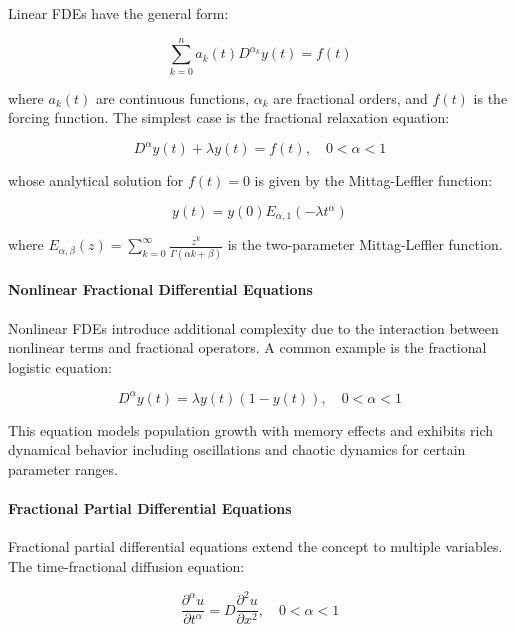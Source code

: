 Linear FDEs have the general form:

\begin{equation}
\sum_{k=0}^{n} a_k(t) D^{\alpha_k} y(t) = f(t)
\end{equation}

where $a_k(t)$ are continuous functions, $\alpha_k$ are fractional orders, and $f(t)$ is the forcing function. The simplest case is the fractional relaxation equation:

\begin{equation}
D^{\alpha} y(t) + \lambda y(t) = f(t), \quad 0 < \alpha < 1
\end{equation}

whose analytical solution for $f(t) = 0$ is given by the Mittag-Leffler function:

\begin{equation}
y(t) = y(0) E_{\alpha,1}(-\lambda t^{\alpha})
\end{equation}

where $E_{\alpha,\beta}(z) = \sum_{k=0}^{\infty} \frac{z^k}{\Gamma(\alpha k + \beta)}$ is the two-parameter Mittag-Leffler function.

\paragraph{Nonlinear Fractional Differential Equations}

Nonlinear FDEs introduce additional complexity due to the interaction between nonlinear terms and fractional operators. A common example is the fractional logistic equation:

\begin{equation}
D^{\alpha} y(t) = \lambda y(t)(1 - y(t)), \quad 0 < \alpha < 1
\end{equation}

This equation models population growth with memory effects and exhibits rich dynamical behavior including oscillations and chaotic dynamics for certain parameter ranges.

\paragraph{Fractional Partial Differential Equations}

Fractional partial differential equations extend the concept to multiple variables. The time-fractional diffusion equation:

\begin{equation}
\frac{\partial^{\alpha} u}{\partial t^{\alpha}} = D \frac{\partial^2 u}{\partial x^2}, \quad 0 < \alpha < 1
\end{equation}

